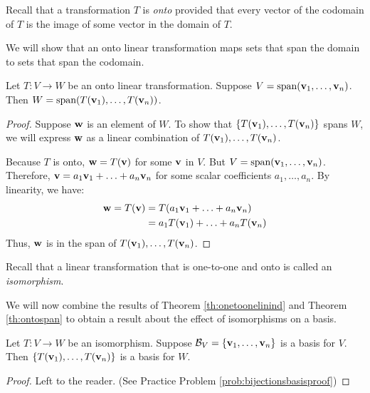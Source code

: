 \documentclass{ximera}
\renewcommand{\vec}[1]{{\bf #1}}
\newcommand{\dfn}{\textit}
\begin{document}
Recall that a transformation $T$ is \dfn{onto} provided that every vector of the codomain of $T$ is the image of some vector in the domain of $T$.  

We will show that an onto linear transformation maps sets that span the domain to sets that span the codomain. 

\begin{theorem}\label{th:ontospan}
Let $T:V\rightarrow W$ be an onto linear transformation.  Suppose $V=\text{span}(\vec{v}_1,\ldots ,\vec{v}_n)$.  Then $W=\text{span}(T(\vec{v}_1),\ldots ,T(\vec{v}_n))$.
\end{theorem}
\begin{proof}
Suppose $\vec{w}$ is an element of $W$. To show that $\{T(\vec{v}_1),\ldots ,T(\vec{v}_n)\}$ spans $W$, we will express $\vec{w}$ as a linear combination of $T(\vec{v}_1),\ldots ,T(\vec{v}_n)$.

Because $T$ is onto, $\vec{w}=T(\vec{v})$ for some $\vec{v}$ in $V$.  But $V=\text{span}(\vec{v}_1,\ldots ,\vec{v}_n)$.  Therefore, $\vec{v}=a_1\vec{v}_1+\ldots +a_n\vec{v}_n$ for some scalar coefficients $a_1,\ldots ,a_n$.
By linearity, we have:
\begin{align*}
\vec{w}=T(\vec{v})&=T(a_1\vec{v}_1+\ldots +a_n\vec{v}_n)\\
&=a_1T(\vec{v}_1)+\ldots +a_nT(\vec{v}_n)
\end{align*}
Thus, $\vec{w}$ is in the span of $T(\vec{v}_1),\ldots ,T(\vec{v}_n)$.
\end{proof}
 
Recall that a linear transformation that is one-to-one and onto is called an \dfn{isomorphism}.

We will now combine the results of Theorem \ref{th:onetoonelinind} and Theorem \ref{th:ontospan} to obtain a result about the effect of isomorphisms on a basis.

\begin{theorem}\label{th:bijectionsbasis}
Let $T:V\rightarrow W$ be an isomorphism.  Suppose $\mathcal{B}_V=\{\vec{v}_1,\ldots ,\vec{v}_n\}$ is a basis for $V$.  Then $\{T(\vec{v}_1),\ldots ,T(\vec{v}_n)\}$ is a basis for $W$.
\end{theorem}
\begin{proof}
Left to the reader.  (See Practice Problem \ref{prob:bijectionsbasisproof}) 
\end{proof}
 
 
\end{document}

